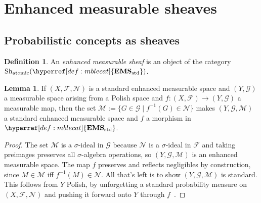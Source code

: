 \documentclass[
  sigconf,
  screen, ]{acmart}
\theoremstyle{definition}
\newtheorem{lemma}[theorem]{Lemma}
\newtheorem{definition}[theorem]{Definition}
\newcommand\calF{\mathcal F}
\newcommand\calG{\mathcal G}
\newcommand\calM{\mathcal M}
\newcommand\calN{\mathcal N}
\newcommand\nref[2]{\hyperref[#1]{#2}} \newcommand\checkhigh{{\huge{\color{red}\textbf{TODO: check}}}}
\newcommand\Shjat{\operatorname{Sh}_{{\rm atomic}}}
\newcommand\sheafcatadj{enhanced measurable}
\newcommand\Sheafcatadj{Enhanced measurable}
\newcommand\texgoodsheaf{\sheafcatadj{} sheaf}
\newcommand\goodsheaf{\texgoodsheaf}
\newcommand\Goodsheavesnolink{\Sheafcatadj{} sheaves}
\newcommand\texStdMble{\mathbf{EMS}_{\rm std}}
\newcommand\StdMble{{\nref{def:mblecat}{\texStdMble}}}
\begin{document}
\section{\Goodsheavesnolink} \label{app:sec:goodsheaves}

\subsection{Probabilistic concepts as sheaves}

\begin{definition} \label{app:def:goodsheaf}
  An \emph{\goodsheaf{}}
  is an object of the category $\Shjat(\StdMble)$.
\end{definition}

\begin{lemma} \label{app:lem:stdmble-pfwd}
  If $(X,\calF,\calN)$
  is a standard enhanced measurable space
  and $(Y,\calG)$
  a measurable space
  arising from a Polish space
  and $f : (X,\calF)\to(Y,\calG)$
  a measurable map,
  then
  the set $\calM := \{G\in \calG \mid f^{-1}(G)\in \calN\}$
  makes $(Y,\calG,\calM)$ a standard enhanced measurable space
  and $f$ a morphism in $\StdMble$.
\end{lemma}
\begin{proof}
  The set $\calM$ is a $\sigma$-ideal in $\calG$
  because $\calN$ is a $\sigma$-ideal in $\calF$
  and taking preimages preserves all $\sigma$-algebra operations,
  so $(Y,\calG,\calM)$ is an enhanced measurable space.
  The map $f$ preserves and reflects negligibles by construction,
  since $M\in \calM$ iff $f^{-1}(M)\in \calN$.
  All that's left is to show $(Y,\calG,\calM)$ is standard.
  This follows from $Y$ Polish, by unforgetting
  a standard probability measure on $(X,\calF,\calN)$
  and pushing it forward onto $Y$ through $f$~\cite[Section 2.7, p.24]{rohlin1949fundamental}.
\end{proof}
\end{document}
